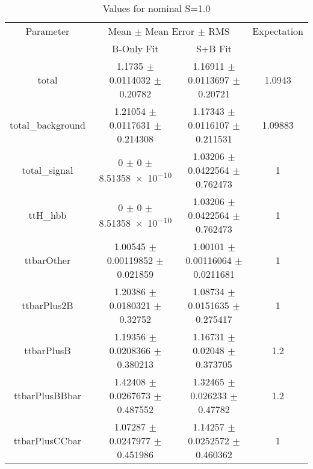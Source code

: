 \begin{table}
\centering
\caption{Values for nominal S=1.0}
\begin{tabular}{cccc}
\toprule
Parameter & \multicolumn{2}{c}{Mean $\pm$ Mean Error $\pm$ RMS} & Expectation\\
 & B-Only Fit & S+B Fit & \\
\midrule
total & \num{1.1735} $\pm$ \num{0.0114032} $\pm$ \num{0.20782} & \num{1.16911} $\pm$ \num{0.0113697} $\pm$ \num{0.20721} & \num{1.0943}\\
total\_background & \num{1.21054} $\pm$ \num{0.0117631} $\pm$ \num{0.214308} & \num{1.17343} $\pm$ \num{0.0116107} $\pm$ \num{0.211531} & \num{1.09883}\\
total\_signal & \num{0} $\pm$ \num{0} $\pm$ \num{8.51358e-10} & \num{1.03206} $\pm$ \num{0.0422564} $\pm$ \num{0.762473} & \num{1}\\
ttH\_hbb & \num{0} $\pm$ \num{0} $\pm$ \num{8.51358e-10} & \num{1.03206} $\pm$ \num{0.0422564} $\pm$ \num{0.762473} & \num{1}\\
ttbarOther & \num{1.00545} $\pm$ \num{0.00119852} $\pm$ \num{0.021859} & \num{1.00101} $\pm$ \num{0.00116064} $\pm$ \num{0.0211681} & \num{1}\\
ttbarPlus2B & \num{1.20386} $\pm$ \num{0.0180321} $\pm$ \num{0.32752} & \num{1.08734} $\pm$ \num{0.0151635} $\pm$ \num{0.275417} & \num{1}\\
ttbarPlusB & \num{1.19356} $\pm$ \num{0.0208366} $\pm$ \num{0.380213} & \num{1.16731} $\pm$ \num{0.02048} $\pm$ \num{0.373705} & \num{1.2}\\
ttbarPlusBBbar & \num{1.42408} $\pm$ \num{0.0267673} $\pm$ \num{0.487552} & \num{1.32465} $\pm$ \num{0.026233} $\pm$ \num{0.47782} & \num{1.2}\\
ttbarPlusCCbar & \num{1.07287} $\pm$ \num{0.0247977} $\pm$ \num{0.451986} & \num{1.14257} $\pm$ \num{0.0252572} $\pm$ \num{0.460362} & \num{1}\\
\bottomrule
\end{tabular}
\end{table}